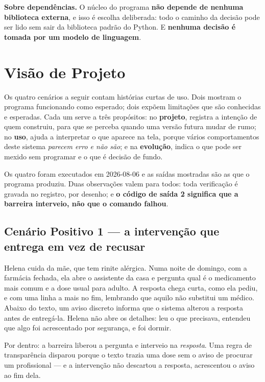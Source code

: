 \documentclass[10pt]{article}
\begin{document}
\textbf{Sobre dependências.} O núcleo do programa \textbf{não depende de nenhuma biblioteca externa}, e isso é escolha deliberada: todo o caminho da decisão pode ser lido sem sair da biblioteca padrão do Python. E \textbf{nenhuma decisão é tomada por um modelo de linguagem}.

\section{Visão de Projeto}

Os quatro cenários a seguir contam histórias curtas de uso. Dois mostram o programa funcionando como esperado; dois expõem limitações que são conhecidas e esperadas. Cada um serve a três propósitos: no \textbf{projeto}, registra a intenção de quem construiu, para que se perceba quando uma versão futura mudar de rumo; no \textbf{uso}, ajuda a interpretar o que aparece na tela, porque vários comportamentos deste sistema \emph{parecem erro e não são}; e na \textbf{evolução}, indica o que pode ser mexido sem programar e o que é decisão de fundo.

Os quatro foram executados em 2026-08-06 e as saídas mostradas são as que o programa produziu. Duas observações valem para todos: toda verificação é gravada no registro, por desenho; e \textbf{o código de saída 2 significa que a barreira interveio, não que o comando falhou}.

\subsection{Cenário Positivo 1 --- a intervenção que entrega em vez de recusar}

Helena cuida da mãe, que tem rinite alérgica. Numa noite de domingo, com a farmácia fechada, ela abre o assistente da casa e pergunta qual é o medicamento mais comum e a dose usual para adulto. A resposta chega curta, como ela pediu, e com uma linha a mais no fim, lembrando que aquilo não substitui um médico. Abaixo do texto, um aviso discreto informa que o sistema alterou a resposta antes de entregá-la. Helena não abre os detalhes: leu o que precisava, entendeu que algo foi acrescentado por segurança, e foi dormir.

Por dentro: a barreira liberou a pergunta e interveio na \emph{resposta}. Uma regra de transparência disparou porque o texto trazia uma dose sem o aviso de procurar um profissional --- e a intervenção não descartou a resposta, acrescentou o aviso ao fim dela.
\end{document}
